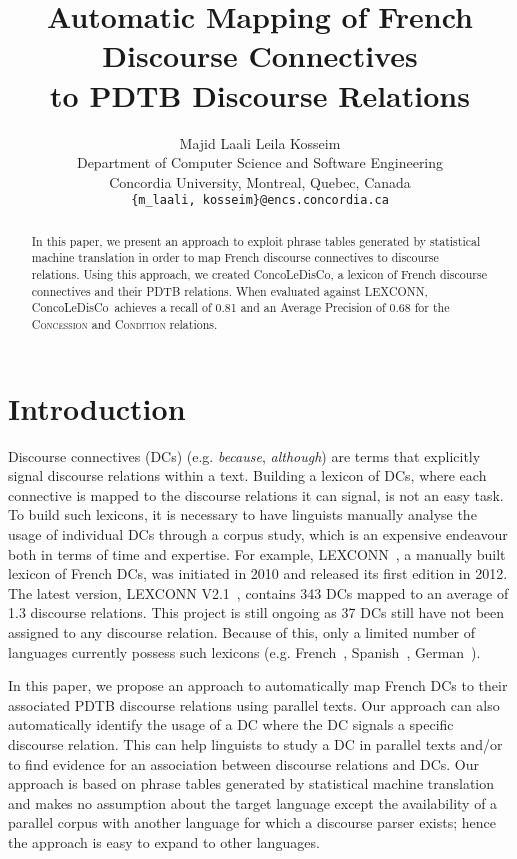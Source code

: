 \documentclass[11pt,a4paper]{article}
\title{Automatic Mapping of French Discourse Connectives \\ to PDTB Discourse Relations}
\author{Majid Laali \hspace{2cm} Leila Kosseim\\
  Department of Computer Science and Software Engineering \\
  Concordia University, Montreal, Quebec, Canada \\
  {\tt \{m\_laali, kosseim\}@encs.concordia.ca} \\
  }
\date{}
\def \dict {ConcoLeDisCo}
\begin{document}
\maketitle

\begin{abstract}
   In this paper, we present an approach to exploit phrase tables generated by statistical machine translation in order to map French discourse connectives to discourse relations. Using this approach, we created \dict, a lexicon of French discourse connectives and their PDTB relations. When evaluated against  LEXCONN, \dict\ achieves a recall of 0.81 and an Average Precision of 0.68 for the \textsc{Concession} and \textsc{Condition} relations.

\end{abstract}


\section{Introduction}

Discourse connectives (DCs) (e.g. \textit{because}, \textit{although}) are terms that explicitly signal discourse relations within a text. Building a lexicon of DCs, where each connective is mapped to the discourse relations it can signal, is not an easy task. To build such lexicons, it is necessary to have linguists manually analyse the usage of individual DCs through a corpus study, which is an expensive endeavour both in terms of time and expertise. For example, LEXCONN~\cite{roze12}, a manually built lexicon of French DCs, was initiated in 2010 and released its first edition in 2012. The latest version, LEXCONN V2.1~\cite{danlos15}, contains 343 DCs mapped to an average of 1.3 discourse relations. This project is still ongoing as 37 DCs still have not been assigned to any discourse relation. Because of this, only a limited number of languages currently possess such lexicons (e.g. French~\cite{roze12}, Spanish~\cite{alonsoalemany02}, German~\cite{stede98}).  

In this paper, we propose an approach to automatically map French DCs to their associated PDTB discourse relations using parallel texts. Our approach can also automatically identify the usage of a DC where the DC signals a specific discourse relation. This can help linguists to study a DC in parallel texts and/or to find evidence for an association between discourse relations and DCs. Our approach is based on phrase tables generated by statistical machine translation and makes no assumption about the target language except the availability of a parallel corpus with another language for which a discourse parser exists; hence the approach is easy to expand to other languages. 
\end{document}

